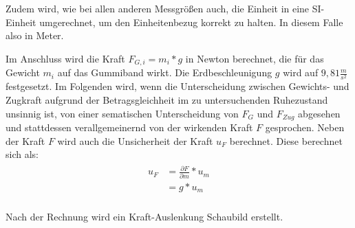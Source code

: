 \documentclass[
  9pt,
]{article}
\newenvironment{Shaded}{\begin{snugshade}}{\end{snugshade}}
\newcommand{\CommentTok}[1]{\textcolor[rgb]{0.56,0.35,0.01}{\textit{#1}}}
\newcommand{\DecValTok}[1]{\textcolor[rgb]{0.00,0.00,0.81}{#1}}
\newcommand{\FloatTok}[1]{\textcolor[rgb]{0.00,0.00,0.81}{#1}}
\newcommand{\NormalTok}[1]{#1}
\newcommand{\OtherTok}[1]{\textcolor[rgb]{0.56,0.35,0.01}{#1}}
\newcommand{\SpecialCharTok}[1]{\textcolor[rgb]{0.00,0.00,0.00}{#1}}
\begin{document}
Zudem wird, wie bei allen anderen Messgrößen auch, die Einheit in eine
SI-Einheit umgerechnet, um den Einheitenbezug korrekt zu halten. In
diesem Falle also in Meter.

Im Anschluss wird die Kraft \(F_{G,i} = m_i * g\) in Newton berechnet,
die für das Gewicht \(m_i\) auf das Gummiband wirkt. Die
Erdbeschleunigung \(g\) wird auf \(9,81\frac{m}{s^2}\) festgesetzt. Im
Folgenden wird, wenn die Unterscheidung zwischen Gewichts- und Zugkraft
aufgrund der Betragsgleichheit im zu untersuchenden Ruhezustand unsinnig
ist, von einer sematischen Unterscheidung von \(F_G\) und \(F_{Zug}\)
abgesehen und stattdessen verallgemeinernd von der wirkenden Kraft \(F\)
gesprochen. Neben der Kraft \(F\) wird auch die Unsicherheit der Kraft
\(u_F\) berechnet. Diese berechnet sich als: \begin{align*}
\begin{split}
u_F &= \frac{\partial F}{\partial {m}}*u_m\\
    &= g*u_m\\
\end{split}
\end{align*}

Nach der Rechnung wird ein Kraft-Auslenkung Schaubild erstellt.

\begin{Shaded}
\end{Shaded}
\end{document}
